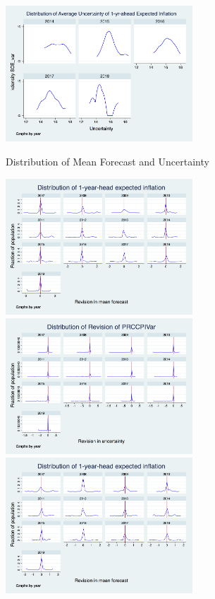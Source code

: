 \documentclass[]{article}
\begin{document}
\begin{figure}[ht]
	\includegraphics[width=7cm]{figures/SCEvar_hist.png}  \\
	\caption{Distribution of Mean Forecast and Uncertainty }
	\label{Unceratitny_Histogram}
\end{figure}


\begin{figure}[ht]
	\centering
	\includegraphics[width=7cm]{figures/PRCCPIMean_rv_hist.png} 
	\includegraphics[width=7cm]{figures/PRCCPIVar_rv_hist.png}  \\
	\smallskip
	\includegraphics[width=7cm]{figures/PRCPCEMean_rv_hist.png} 

\end{figure}
\end{document}
